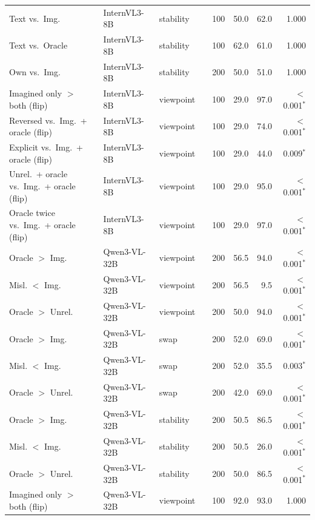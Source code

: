 \begin{longtable}{llllrrrr}
Text vs.\ Img. & InternVL3-8B & stability & & 100 & 50.0 & 62.0 & 1.000 \\
Text vs.\ Oracle & InternVL3-8B & stability & & 100 & 62.0 & 61.0 & 1.000 \\
Own vs.\ Img. & InternVL3-8B & stability & & 200 & 50.0 & 51.0 & 1.000 \\
Imagined only $>$ both (flip) & InternVL3-8B & viewpoint & & 100 & 29.0 & 97.0 & $<$0.001$^*$ \\
Reversed vs.\ Img.\ + oracle (flip) & InternVL3-8B & viewpoint & & 100 & 29.0 & 74.0 & $<$0.001$^*$ \\
Explicit vs.\ Img.\ + oracle (flip) & InternVL3-8B & viewpoint & & 100 & 29.0 & 44.0 & 0.009$^*$ \\
Unrel.\ + oracle vs.\ Img.\ + oracle (flip) & InternVL3-8B & viewpoint & & 100 & 29.0 & 95.0 & $<$0.001$^*$ \\
Oracle twice vs.\ Img.\ + oracle (flip) & InternVL3-8B & viewpoint & & 100 & 29.0 & 97.0 & $<$0.001$^*$ \\
Oracle $>$ Img. & Qwen3-VL-32B & viewpoint & & 200 & 56.5 & 94.0 & $<$0.001$^*$ \\
Misl. $<$ Img. & Qwen3-VL-32B & viewpoint & & 200 & 56.5 & 9.5 & $<$0.001$^*$ \\
Oracle $>$ Unrel. & Qwen3-VL-32B & viewpoint & & 200 & 50.0 & 94.0 & $<$0.001$^*$ \\
Oracle $>$ Img. & Qwen3-VL-32B & swap & & 200 & 52.0 & 69.0 & $<$0.001$^*$ \\
Misl. $<$ Img. & Qwen3-VL-32B & swap & & 200 & 52.0 & 35.5 & 0.003$^*$ \\
Oracle $>$ Unrel. & Qwen3-VL-32B & swap & & 200 & 42.0 & 69.0 & $<$0.001$^*$ \\
Oracle $>$ Img. & Qwen3-VL-32B & stability & & 200 & 50.5 & 86.5 & $<$0.001$^*$ \\
Misl. $<$ Img. & Qwen3-VL-32B & stability & & 200 & 50.5 & 26.0 & $<$0.001$^*$ \\
Oracle $>$ Unrel. & Qwen3-VL-32B & stability & & 200 & 50.0 & 86.5 & $<$0.001$^*$ \\
Imagined only $>$ both (flip) & Qwen3-VL-32B & viewpoint & & 100 & 92.0 & 93.0 & 1.000 \\
\bottomrule
\end{longtable}
